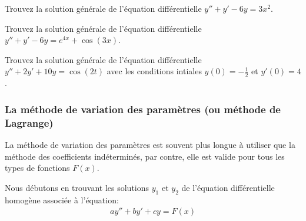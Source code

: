 \documentclass[]{book}
\theoremstyle{definition}
\theoremstyle{definition}
\theoremstyle{definition}
\theoremstyle{remark}
\let\BeginKnitrBlock\begin \let\EndKnitrBlock\end
\begin{document}
\BeginKnitrBlock{example}
\protect\hypertarget{exm:unnamed-chunk-85}{}{\label{exm:unnamed-chunk-85}
}Trouvez la solution générale de l'équation différentielle
\(y''+y'-6y=3x^2\).
\EndKnitrBlock{example}
\vspace*{10cm}

\BeginKnitrBlock{example}
\protect\hypertarget{exm:unnamed-chunk-86}{}{\label{exm:unnamed-chunk-86}
}Trouvez la solution générale de l'équation différentielle
\(y''+y'-6y=e^{4x}+\cos(3x)\).
\EndKnitrBlock{example}
\vspace*{10cm}

\BeginKnitrBlock{example}
\protect\hypertarget{exm:unnamed-chunk-87}{}{\label{exm:unnamed-chunk-87}
}Trouvez la solution générale de l'équation différentielle
\(y''+2y'+10y=\cos(2t)\) avec les conditions intiales
\(y(0)=-\frac{1}{2}\) et \(y'(0)=4\).
\EndKnitrBlock{example}
\vspace*{15cm}

\hypertarget{la-methode-de-variation-des-parametres-ou-methode-de-lagrange}{%
\subsubsection{La méthode de variation des paramètres (ou méthode de
Lagrange)}\label{la-methode-de-variation-des-parametres-ou-methode-de-lagrange}}

La méthode de variation des paramètres est souvent plus longue à
utiliser que la méthode des coefficients indéterminés, par contre, elle
est valide pour tous les types de fonctions \(F(x)\).

Nous débutons en trouvant les solutions \(y_1\) et \(y_2\) de l'équation
différentielle homogène associée à l'équation: \begin{align*}
ay''+by'+cy=F(x)
\end{align*}
\end{document}

